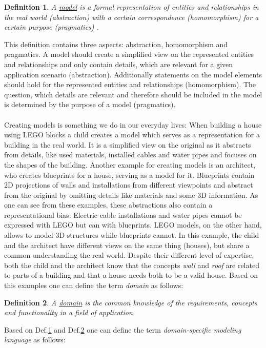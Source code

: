 \documentclass[runningheads,a4paper]{llncs}
\newtheorem{defn}{Definition}
\begin{document}
\begin{defn}
    \label{def:model}
    A \underline{model} is a formal representation of entities and relationships in the real world (abstraction) 
    with a certain correspondence (homomorphism) for a certain purpose (pragmatics) \cite{stachowiak1973allgemeine}.
\end{defn}
This definition contains three aspects: abstraction, homomorphism and pragmatics.
A model should create a simplified view on the represented entities and relationships and 
only contain details, which are relevant for a given application scenario (abstraction).
Additionally statements on the model elements should hold for the represented entities and relationships (homomorphism).
The question, which details are relevant and therefore should be included in the model is determined by the purpose of a model (pragmatics).  
\\\\
Creating models is something we do in our everyday lives:
When building a house using LEGO blocks a child creates a model which serves as a representation for a building in the real world.
It is a simplified view on the original as it abstracts from details, like used materials, installed cables and water pipes and focuses
on the shapes of the building. Another example for creating models is an architect, who creates blueprints for a house, serving as a model for it.
Blueprints contain 2D projections of walls and installations from different viewpoints and abstract from the original by omitting
details like materials and some 3D information. As one can see from these examples, these abstractions also contain a representational bias:
Electric cable installations and water pipes cannot be expressed with LEGO but can with blueprints.
LEGO models, on the other hand, allows to model 3D structures while blueprints cannot.
In this example, the child and the architect have different views on the same thing (houses), but share a common understanding the real world.
Despite their different level of expertise, both the child and the architect know that the concepts \textit{wall} and \textit{roof} 
are related to parts of a building and that a house needs both to be a valid house.
Based on this examples one can define the term \textit{domain} as follows:
\begin{defn}
\label{def:domain}
A \underline{domain} is the common knowledge of the requirements, concepts and functionality in a field of application.
\end{defn}
Based on Def.\ref{def:model} and Def.\ref{def:domain} one can define the term \emph{domain-specific modeling language} as follows:
\end{document}
